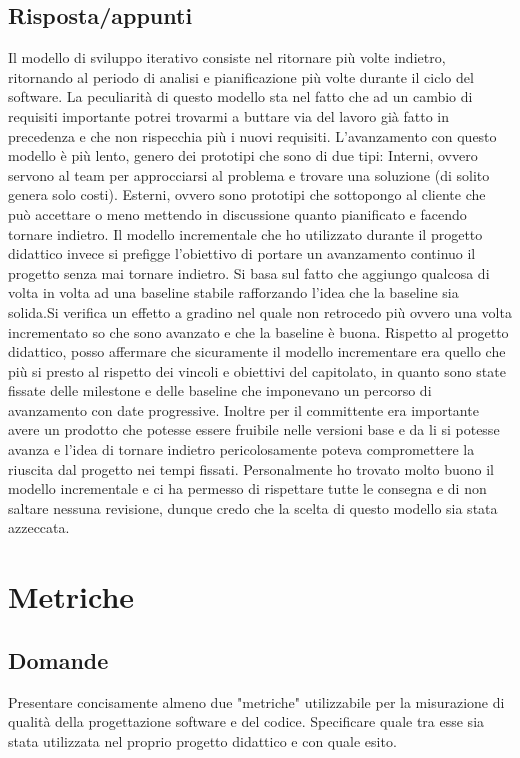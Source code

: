 \subsection*{Risposta/appunti}
Il modello di sviluppo iterativo consiste nel ritornare più volte indietro, ritornando al periodo di analisi e pianificazione
più volte durante il ciclo del software. La peculiarità di questo modello sta nel fatto che ad un cambio di requisiti
importante potrei trovarmi a buttare via del lavoro già fatto in precedenza e che non rispecchia più i nuovi requisiti.
L'avanzamento con questo modello è più lento, genero dei prototipi che sono di due tipi:
Interni, ovvero servono al team per approcciarsi al problema e trovare una soluzione (di solito genera solo costi).
Esterni, ovvero sono prototipi che sottopongo al cliente che può accettare o meno mettendo in discussione quanto
pianificato e facendo tornare indietro.
Il modello incrementale che ho utilizzato durante il progetto didattico invece si prefigge l'obiettivo di portare un
avanzamento continuo il progetto senza mai tornare indietro.
Si basa sul fatto che aggiungo qualcosa di volta in volta ad una baseline stabile rafforzando l'idea che la baseline sia
solida.Si verifica un effetto a gradino nel quale non retrocedo più ovvero una volta incrementato so che sono avanzato e
che la baseline è buona.
Rispetto al progetto didattico, posso affermare che sicuramente il modello incrementare era quello che più si presto al
rispetto dei vincoli e obiettivi del capitolato, in quanto sono state fissate delle milestone e delle baseline che
imponevano un percorso di avanzamento con date progressive. Inoltre per il committente era importante avere un
prodotto che potesse essere fruibile nelle versioni base e da li si potesse avanza e l'idea di tornare indietro
pericolosamente poteva compromettere la riuscita dal progetto nei tempi fissati.
Personalmente ho trovato molto buono il modello incrementale e ci ha permesso di rispettare tutte le consegna e di non
saltare nessuna revisione, dunque credo che la scelta di questo modello sia stata azzeccata.

\section{Metriche}

\subsection*{Domande}
Presentare concisamente almeno due "metriche" utilizzabile per la misurazione di qualità della progettazione software e del codice.
Specificare quale tra esse sia stata utilizzata nel proprio progetto didattico e con quale esito. \\


